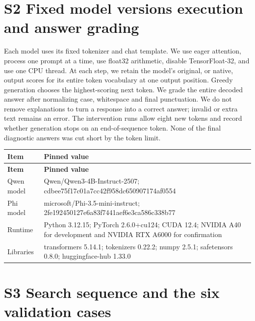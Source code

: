 \documentclass[10pt,letterpaper]{article}
\begin{document}
\section*{S2 Fixed model versions execution and answer grading}

Each model uses its fixed tokenizer and chat template. We use eager attention, process one prompt at a time, use float32 arithmetic, disable TensorFloat-32, and use one CPU thread. At each step, we retain the model's original, or native, output scores for its entire token vocabulary at one output position. Greedy generation chooses the highest-scoring next token. We grade the entire decoded answer after normalizing case, whitespace and final punctuation. We do not remove explanations to turn a response into a correct answer; invalid or extra text remains an error. The intervention runs allow eight new tokens and record whether generation stops on an end-of-sequence token. None of the final diagnostic answers was cut short by the token limit.


\begingroup\small{}
\begin{longtable}{|>{\raggedright\arraybackslash}p{}|>{\raggedright\arraybackslash}p{}|}
\hline
\textbf{Item} & \textbf{Pinned value}\\\hline
\endfirsthead
\hline
\textbf{Item} & \textbf{Pinned value}\\\hline
\endhead
Qwen model & Qwen/Qwen3-4B-Instruct-2507; cdbee75f17c01a7cc42f958dc650907174af0554\\\hline
Phi model & microsoft/Phi-3.5-mini-instruct; 2fe192450127e6a83f7441aef6e3ca586c338b77\\\hline
Runtime & Python 3.12.15; PyTorch 2.6.0+cu124; CUDA 12.4; NVIDIA A40 for development and NVIDIA RTX A6000 for confirmation\\\hline
Libraries & transformers 5.14.1; tokenizers 0.22.2; numpy 2.5.1; safetensors 0.8.0; huggingface-hub 1.33.0\\\hline
\end{longtable}
\endgroup

\section*{S3 Search sequence and the six validation cases}
\end{document}
